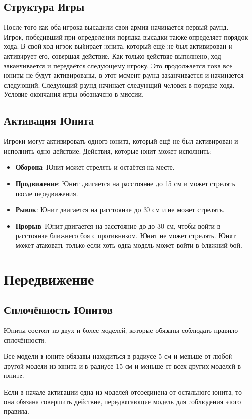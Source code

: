 \documentclass[twocolumn]{article}
\newcommand{\h}[1]{\textbf{#1}}
\begin{document}
\subsection{Структура Игры}
После того как оба игрока высадили свои армии начинается первый раунд. Игрок, победивший при определении порядка высадки также определяет порядок хода. В свой ход игрок выбирает юнита, который ещё не был активирован и активирует его, совершая действие. Как только действие выполнено, ход заканчивается и передаётся следующему игроку. Это продолжается пока все юниты не будут активированы, в этот момент раунд заканчивается и начинается следующий. Следующий раунд начинает следующий человек в порядке хода. Условие окончания игры обозначено в миссии.

\subsection{Активация Юнита}
Игроки могут активировать одного юнита, который ещё не был активирован и исполнить одно действие.
Действия, которые юнит может исполнить:
\begin{itemize}
    \item \h{Оборона}: Юнит может стрелять и остаётся на месте.
    \item \h{Продвижение}: Юнит двигается на расстояние до 15 см и может стрелять после передвижения.
    \item \h{Рывок}: Юнит двигается на расстояние до 30 см и не может стрелять.
    \item \h{Прорыв}: Юнит двигается на расстояние до до 30 см, чтобы войти в расстояние ближнего боя с противником. Юнит не может стрелять. Юнит может атаковать только если хоть одна модель может войти в ближний бой.
\end{itemize}

\section{Передвижение}
\subsection{Сплочённость Юнитов}
Юниты состоят из двух и более моделей, которые обязаны соблюдать правило сплочённости.

Все модели в юните обязаны находиться в радиусе 5 см и меньше от любой другой модели из юнита и в радиусе 15 см и меньше от всех других моделей в юните. 

Если в начале активации одна из моделей отсоединена от остального юнита, то она обязана совершить действие, передвигающие модель для соблюдения этого правила.
\end{document}
